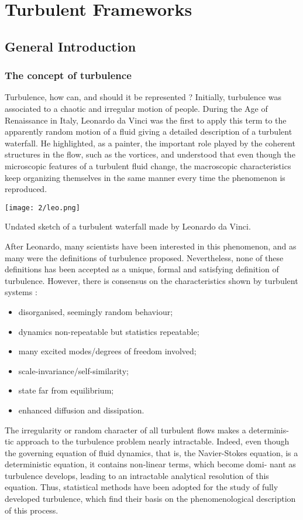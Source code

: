 \setchapterpreamble[u]{\vspace*{-3\baselineskip}\margintoc}
\chapter{Turbulent Frameworks}

\section{General Introduction}
\subsection{The concept of turbulence}
 Turbulence, how can, and should it be represented ?
Initially, turbulence was associated to a chaotic and irregular
motion of people.
During the Age of Renaissance in Italy, Leonardo da Vinci was the first to
apply this term to the apparently random motion of a fluid giving a detailed
description of a turbulent waterfall. He highlighted, as a painter, 
the important role played by the coherent structures in the flow, such as the
vortices, and understood that even though the microscopic features of a turbulent fluid change, the macroscopic characteristics keep organizing themselves in the same manner every time the phenomenon is reproduced. 
\begin{marginfigure}[2cm]
\texttt{[image: 2/leo.png]}
\caption{Undated sketch of a turbulent waterfall made by Leonardo da Vinci.}
\end{marginfigure}
After Leonardo, many scientists have been interested in this phenomenon, and as many were the definitions of turbulence proposed. Nevertheless, none of these definitions has been accepted as a unique, formal and satisfying definition of turbulence. However, there is consensus on the characteristics shown by turbulent systems :
\begin{itemize}[leftmargin=1.5cm]
\item disorganised, seemingly random behaviour;
\item dynamics non-repeatable but statistics repeatable;
\item many excited modes/degrees of freedom involved;
\item scale-invariance/self-similarity;
\item state far from equilibrium;
\item enhanced diffusion and dissipation.
\end{itemize}
The irregularity or random character of all turbulent flows makes a determinis-
tic approach to the turbulence problem nearly intractable. Indeed, even though
the governing equation of fluid dynamics, that is, the Navier-Stokes equation,
is a deterministic equation, it contains non-linear terms, which become domi-
nant as turbulence develops, leading to an intractable analytical resolution of
this equation. Thus, statistical methods have been adopted for the study of
fully developed turbulence, which find their basis on the phenomenological
description of this process. 


